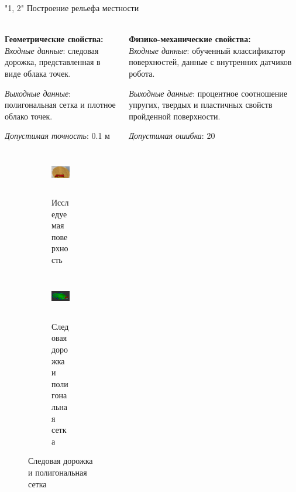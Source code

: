 \begin{frame}[t]{"1, 2" Построение рельефа местности}
    \framesubtitle{}
    \begin{columns}[T,onlytextwidth]
        \begin{column}{0.49\textwidth}
            \textbf{Геометрические свойства:}\\
            \textit{Входные данные}: следовая дорожка, представленная в виде облака точек.

            \textit{Выходные данные}: полигональная сетка и плотное облако точек.

            \textit{Допустимая точность}: 0.1 м
            \begin{figure}[H]
                \begin{subfigure}[t]{0.49\textwidth}
                    \centering\includegraphics[height=2cm,width=1\textwidth,keepaspectratio]{../images/slides/surface_research.png}
                    \caption{Исследуемая поверхность}
                \end{subfigure}
                \begin{subfigure}[t]{0.49\textwidth}
                    \centering\includegraphics[height=2cm,width=1\textwidth,keepaspectratio]{../images/slides/result_research.png}
                    \caption{Следовая дорожка и полигональная сетка}
                \end{subfigure}
            \end{figure}
        \end{column}
        \begin{column}{0.49\textwidth}
            \textbf{Физико-механические свойства:}\\
            \textit{Входные данные}: обученный классификатор поверхностей, данные с внутренних датчиков робота.

            \textit{Выходные данные}: процентное соотношение упругих, твердых и пластичных свойств пройденной поверхности.

            \textit{Допустимая ошибка}: 20%


\end{column}
\end{columns}
\end{frame}
